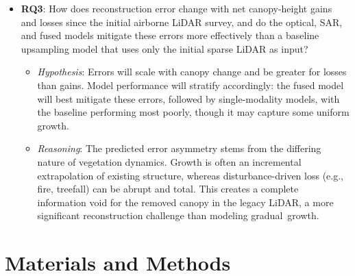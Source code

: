\documentclass[remotesensing,article,accept,pdftex,moreauthors]{Definitions/mdpi}
\begin{document}
\begin{itemize}
  \item \textbf{RQ3}: How does reconstruction error change with net canopy-height gains and losses since the initial airborne LiDAR survey, and do the optical, SAR, and fused models mitigate these errors more effectively than a baseline upsampling model that uses only the initial sparse LiDAR as input?
        \begin{itemize}
            \item \textit{Hypothesis}: Errors will scale with canopy change and be greater for losses than gains. Model performance will stratify accordingly: the fused model will best mitigate these errors, followed by single-modality models, with the baseline performing most poorly, though it may capture some uniform growth.
            \item \textit{Reasoning}: The predicted error asymmetry stems from the differing nature of vegetation dynamics. Growth is often an incremental extrapolation of existing structure, whereas disturbance-driven loss (e.g., fire, treefall) can be abrupt and total. This creates a complete information void for the removed canopy in the legacy LiDAR, a more significant reconstruction challenge than modeling \mbox{gradual growth}.
        \end{itemize}
\end{itemize}





\section{Materials and Methods}


\end{document}
